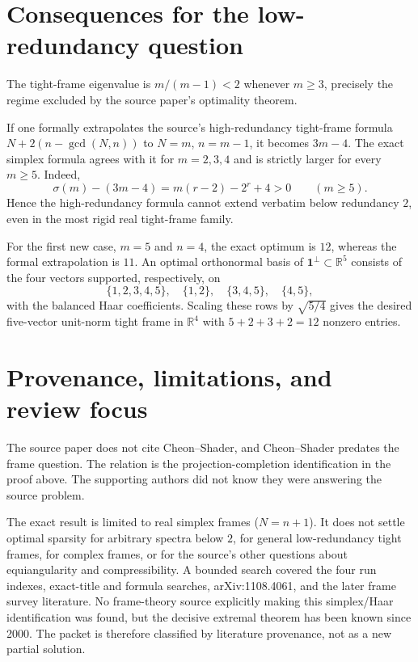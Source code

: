 \documentclass[11pt]{article}
\newcommand{\R}{\mathbb R}
\begin{document}
\section{Consequences for the low-redundancy question}

The tight-frame eigenvalue is $m/(m-1)<2$ whenever $m\geq3$, precisely the
regime excluded by the source paper's optimality theorem.

If one formally extrapolates the source's high-redundancy tight-frame formula
$N+2(n-\gcd(N,n))$ to $N=m$, $n=m-1$, it becomes $3m-4$.  The exact simplex
formula agrees with it for $m=2,3,4$ and is strictly larger for every
$m\geq5$.  Indeed,
\[
 \sigma(m)-(3m-4)=m(r-2)-2^r+4>0\qquad(m\geq5).
\]
Hence the high-redundancy formula cannot extend verbatim below redundancy
$2$, even in the most rigid real tight-frame family.

For the first new case, $m=5$ and $n=4$, the exact optimum is $12$, whereas
the formal extrapolation is $11$.  An optimal orthonormal basis of
$\mathbf 1^\perp\subset\R^5$ consists of the four vectors supported,
respectively, on
\[
 \{1,2,3,4,5\},\quad \{1,2\},\quad \{3,4,5\},\quad \{4,5\},
\]
with the balanced Haar coefficients.  Scaling these rows by $\sqrt{5/4}$
gives the desired five-vector unit-norm tight frame in $\R^4$ with
$5+2+3+2=12$ nonzero entries.

\section{Provenance, limitations, and review focus}

The source paper does not cite Cheon--Shader, and Cheon--Shader predates the
frame question.  The relation is the projection-completion identification in
the proof above.  The supporting authors did not know they were answering the
source problem.

The exact result is limited to real simplex frames ($N=n+1$).  It does not
settle optimal sparsity for arbitrary spectra below $2$, for general
low-redundancy tight frames, for complex frames, or for the source's other
questions about equiangularity and compressibility.  A bounded search covered
the four run indexes, exact-title and formula searches, arXiv:1108.4061, and
the later frame survey literature.  No frame-theory source explicitly making
this simplex/Haar identification was found, but the decisive extremal theorem
has been known since 2000.  The packet is therefore classified by literature
provenance, not as a new partial solution.
\end{document}
